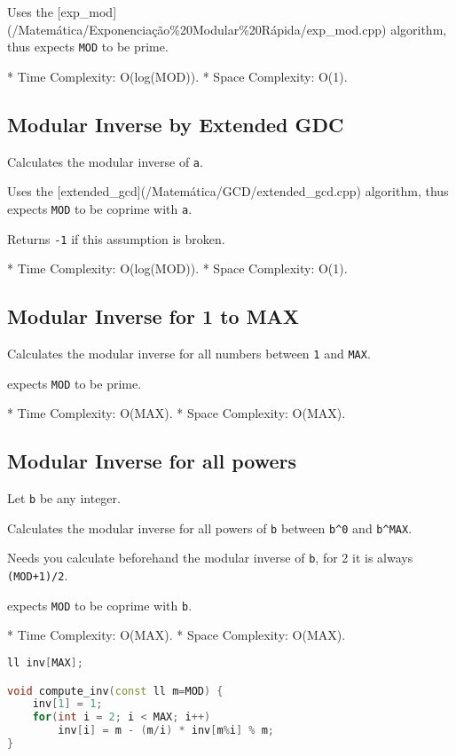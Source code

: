 \documentclass[11pt, a4paper, twoside]{article}
\begin{document}
Uses the [exp\_mod](/Matemática/Exponenciação\%20Modular\%20Rápida/exp\_mod.cpp) algorithm, thus expects \lstinline{MOD} to be prime.

* Time Complexity: O(log(MOD)).
* Space Complexity: O(1).

\subsection{Modular Inverse by Extended GDC}


Calculates the modular inverse of \lstinline{a}.

Uses the [extended\_gcd](/Matemática/GCD/extended\_gcd.cpp) algorithm, thus expects \lstinline{MOD} to be coprime with \lstinline{a}.

Returns \lstinline{-1} if this assumption is broken.

* Time Complexity: O(log(MOD)).
* Space Complexity: O(1).

\subsection{Modular Inverse for 1 to MAX}


Calculates the modular inverse for all numbers between \lstinline{1} and \lstinline{MAX}.

expects \lstinline{MOD} to be prime.

* Time Complexity: O(MAX).
* Space Complexity: O(MAX).

\subsection{Modular Inverse for all powers}


Let \lstinline{b} be any integer.

Calculates the modular inverse for all powers of \lstinline{b} between \lstinline{b^0} and \lstinline{b^MAX}.

Needs you calculate beforehand the modular inverse of \lstinline{b}, for 2 it is always \lstinline{(MOD+1)/2}.

expects \lstinline{MOD} to be coprime with \lstinline{b}.

* Time Complexity: O(MAX).
* Space Complexity: O(MAX).

\begin{multicols}{2}
\begin{lstlisting}[language=C++]
ll inv[MAX];

void compute_inv(const ll m=MOD) {
    inv[1] = 1;
    for(int i = 2; i < MAX; i++)
        inv[i] = m - (m/i) * inv[m%i] % m;
}
\end{lstlisting}
\end{multicols}
\end{document}

